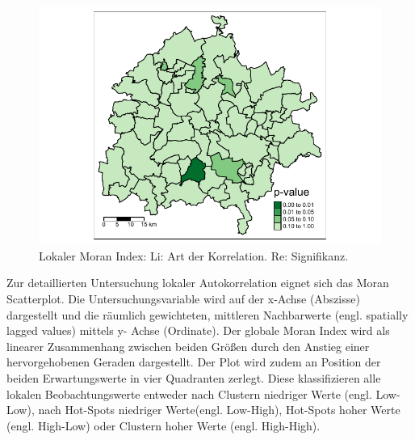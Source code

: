 \begin{figure}[!ht]
\begin{minipage}[b]{.48\linewidth}
    \includegraphics[scale=0.75,trim={0.2cm 0.1cm 0.2cm 0.1cm},clip]{body/figures/analysis/metropol-pval.pdf}%
\end{minipage}
\caption[Lokale Autokorrelation]{Lokaler Moran Index: Li: Art der Korrelation. Re: Signifikanz. }
\label{fig_metropol_LMI}
\end{figure}


Zur detaillierten Untersuchung lokaler Autokorrelation eignet sich das Moran Scatterplot. 
Die Untersuchungsvariable  wird auf der x-Achse (Abszisse) dargestellt und die 
räumlich gewichteten, mittleren Nachbarwerte (engl. spatially lagged values) mittels y- Achse (Ordinate). 
Der globale Moran Index wird als linearer Zusammenhang zwischen beiden Größen durch den Anstieg 
einer hervorgehobenen Geraden dargestellt. Der Plot wird zudem an Position der beiden 
Erwartungswerte in vier Quadranten zerlegt. Diese klassifizieren alle lokalen Beobachtungswerte 
entweder nach Clustern niedriger Werte (engl. Low-Low), nach Hot-Spots niedriger Werte(engl. Low-High), 
Hot-Spots hoher Werte (engl. High-Low) oder Clustern hoher Werte (engl. High-High).